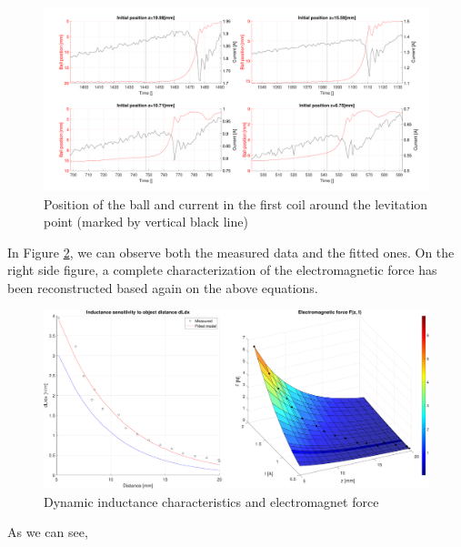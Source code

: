 \begin{figure}[H]
    \centering
    \includegraphics[width=1\textwidth]{img/MATLAB/measurements/currents_for_force.pdf}
    \caption{Position of the ball and current in the first coil around the levitation point (marked by vertical black line)}
    \label{fig:levitation_current}
\end{figure}

In Figure \ref{fig:dynamic_inductance_characteristics}, we can observe both the measured data and the fitted ones.
On the right side figure, a complete characterization of the electromagnetic force has been reconstructed based again on the above equations.

\begin{figure}[H]
    \centering
    \includegraphics[width=1\textwidth]{img/MATLAB/measurements/force.pdf}
    \caption{Dynamic inductance characteristics and electromagnet force}
    \label{fig:dynamic_inductance_characteristics}
\end{figure}

As we can see,